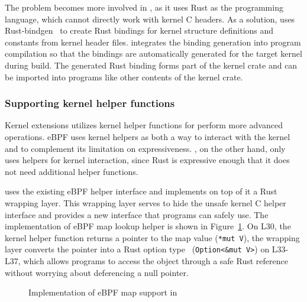 The problem becomes more involved in \projname{}, as it uses Rust as the
    programming language, which cannot directly work with kernel C headers.
As a solution, \projname{} uses Rust-bindgen~\cite{bindgen} to create Rust
    bindings for kernel structure definitions and constants from kernel header
    files.
\projname{} integrates the binding generation into program compilation so that
    the bindings are automatically generated for the target kernel during
    build.
The generated Rust binding forms part of the kernel crate and can be imported
    into \projname{} programs like other contents of the kernel crate.

\subsubsection{Supporting kernel helper functions}
\label{impl:crate:symbol-resolv}
Kernel extensions utilizes kernel helper functions for perform more advanced
    operations.
eBPF uses kernel helpers as both a way to interact with the kernel and to
    complement its limitation on expressiveness.
\projname{}, on the other hand, only uses helpers for kernel interaction, since
    Rust is expressive enough that it does not need additional helper functions.

\projname{} uses the existing eBPF helper interface and implements on top of
    it a Rust wrapping layer.
This wrapping layer serves to hide the unsafe kernel C helper interface and
    provides a new interface that \projname{} programs can safely use.
The implementation of eBPF map lookup helper is shown in
    Figure~\ref{fig:map-helper}.
On L30, the kernel helper function returns a pointer to the map value
    (\texttt{*mut V}), the \projname{} wrapping layer converts the pointer
    into a Rust option type~\cite{rust-option} (\texttt{Option<\&mut V>}) on
    L33-L37, which allows \projname{} programs to access the object through a
    safe Rust reference without worrying about deferencing a null pointer.

\begin{figure}[t]
    
    \vspace{-10pt}
    \caption{Implementation of eBPF map support in \projname{}}
    \vspace{-10pt}
    \label{fig:map-helper}
\end{figure}

